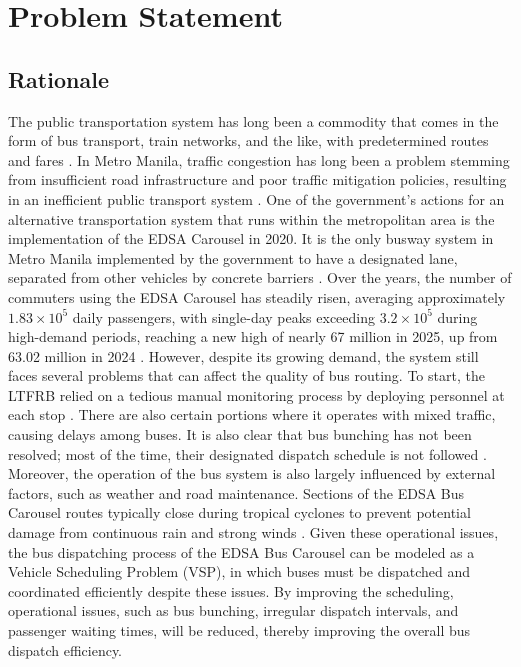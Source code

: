 \chapter{Problem Statement}

\section{Rationale}
The public transportation system has long been a commodity that comes in the form of bus transport, train networks, and the like, with predetermined routes and fares \cite{Tironi2018}. In Metro Manila, traffic congestion has long been a problem stemming from insufficient road infrastructure and poor traffic mitigation policies, resulting in an inefficient public transport system \cite{Spatio2026}. One of the government's actions for an alternative transportation system that runs within the metropolitan area is the implementation of the EDSA Carousel in 2020. It is the only busway system in Metro Manila implemented by the government to have a designated lane, separated from other vehicles by concrete barriers \cite{Chua2026}. Over the years, the number of commuters using the EDSA Carousel has steadily risen, averaging approximately $1.83\times10^5$ daily passengers, with single-day peaks exceeding $3.2\times10^5$ during high-demand periods, reaching a new high of nearly 67 million in 2025, up from 63.02 million in 2024 \cite{DOTr2025Ridership}. However, despite its growing demand, the system still faces several problems that can affect the quality of bus routing. To start, the LTFRB relied on a tedious manual monitoring process by deploying personnel at each stop \cite{EDSApolicy2023}. There are also certain portions where it operates with mixed traffic, causing delays among buses. It is also clear that bus bunching has not been resolved; most of the time, their designated dispatch schedule is not followed \cite{Ollero2024EDSA}. Moreover, the operation of the bus system is also largely influenced by external factors, such as weather and road maintenance. Sections of the EDSA Bus Carousel routes typically close during tropical cyclones to prevent potential damage from continuous rain and strong winds \cite{DOTr2020Suspension}. Given these operational issues, the bus dispatching process of the EDSA Bus Carousel can be modeled as a Vehicle Scheduling Problem (VSP), in which buses must be dispatched and coordinated efficiently despite these issues. By improving the scheduling, operational issues, such as bus bunching, irregular dispatch intervals, and passenger waiting times, will be reduced, thereby improving the overall bus dispatch efficiency.

